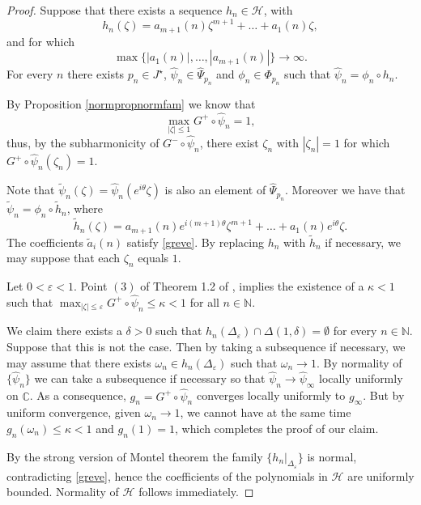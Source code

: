 \documentclass[10pt,a4paper]{article}
\begin{document}
\begin{proof}
Suppose that there exists a sequence $h_n\in\mathcal H$, with
$$
h_n(\zeta)=a_{m+1}(n)\zeta^{m+1}+\dots + a_1(n)\zeta,
$$
and for which
\begin{equation}
\label{greve}
\max\{|a_1(n)|,\dots,|a_{m+1}(n)|\}\to\infty.
\end{equation}
For every $n$ there exists $p_n\in J^\star$, $\widehat\psi_n\in\widehat \Psi_{p_n}$ and $\phi_n\in\Phi_{p_n}$ such that $\widehat\psi_n=\phi_n\circ h_n$.

By Proposition \ref{normpropnormfam} we know that
\[
\max_{|\zeta|\leq 1}G^+\circ\widehat\psi_n=1,
\]
thus, by the subharmonicity of $G^-\circ\widehat\psi_n$, there exist $\zeta_n$ with $|\zeta_n|=1$ for which $G^+\circ \widehat\psi_n(\zeta_n)=1$.

Note that $\tilde\psi_n(\zeta)=\widehat\psi_n(e^{i\theta}\zeta)$ is also an element of $\widehat\Psi_{p_n}$. Moreover we have that $\tilde\psi_n=\phi_n\circ \tilde h_n$, where
\[
\tilde h_n(\zeta)=a_{m+1}(n)e^{i(m+1)\theta}\zeta^{m+1}+\dots+a_1(n)e^{i\theta}\zeta.
\]
The coefficients $\tilde a_i(n)$ satisfy \eqref{greve}. By replacing $h_n$ with $\tilde h_n$ if necessary, we may suppose that each $\zeta_n$ equals $1$.

Let $0<\varepsilon<1$. Point $(3)$ of Theorem 1.2 of \cite{BS8}, implies the existence of a $\kappa<1$ such that $\max_{|\zeta|\leq \varepsilon} G^+\circ\widehat\psi_n\leq \kappa<1$ for all $n \in \mathbb N$.

We claim there exists a $\delta>0$ such that $h_n(\Delta_\varepsilon)\cap \Delta(1,\delta)=\emptyset$ for every $n\in\mathbb N$. Suppose that this is not the case. Then by taking a subsequence if necessary, we may assume that there exists $\omega_n\in h_n(\Delta_\varepsilon)$ such that $\omega_n\to 1$. By normality of $\{\widehat\psi_n\}$ we can take a subsequence if necessary so that $\widehat\psi_n\to\widehat\psi_\infty$ locally uniformly on $\mathbb C$. As a consequence, $g_n=G^+\circ\widehat\psi_n$ converges locally uniformly to $g_\infty$. But by uniform convergence, given $\omega_n\to 1$, we cannot have at the same time $g_n(\omega_n)\leq \kappa<1$ and $g_n(1)=1$, which completes the proof of our claim.

By the strong version of Montel theorem the family $\{h_n|_{\Delta_\varepsilon}\}$ is normal, contradicting \eqref{greve}, hence the coefficients of the polynomials in $\mathcal H$ are uniformly bounded. Normality of $\mathcal H$ follows immediately.


\end{proof}
\end{document}

